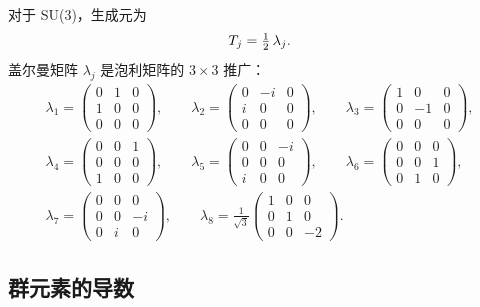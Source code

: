 对于 SU(3)，生成元为
\begin{equation}
  T_j = \tfrac{1}{2}\,\lambda_j .
\end{equation}
盖尔曼矩阵 $\lambda_j$ 是泡利矩阵的 $3\times 3$ 推广：
\begin{equation}
  \begin{gathered}
    \lambda_1 = \begin{pmatrix} 0 & 1 & 0 \\ 1 & 0 & 0 \\ 0 & 0 & 0 \end{pmatrix},\qquad
    \lambda_2 = \begin{pmatrix} 0 & -i & 0 \\ i & 0 & 0 \\ 0 & 0 & 0 \end{pmatrix},\qquad
    \lambda_3 = \begin{pmatrix} 1 & 0 & 0 \\ 0 & -1 & 0 \\ 0 & 0 & 0 \end{pmatrix},\\[4pt]
    \lambda_4 = \begin{pmatrix} 0 & 0 & 1 \\ 0 & 0 & 0 \\ 1 & 0 & 0 \end{pmatrix},\qquad
    \lambda_5 = \begin{pmatrix} 0 & 0 & -i \\ 0 & 0 & 0 \\ i & 0 & 0 \end{pmatrix},\qquad
    \lambda_6 = \begin{pmatrix} 0 & 0 & 0 \\ 0 & 0 & 1 \\ 0 & 1 & 0 \end{pmatrix},\\[4pt]
    \lambda_7 = \begin{pmatrix} 0 & 0 & 0 \\ 0 & 0 & -i \\ 0 & i & 0 \end{pmatrix},\qquad
    \lambda_8 = \frac{1}{\sqrt{3}}
    \begin{pmatrix} 1 & 0 & 0 \\ 0 & 1 & 0 \\ 0 & 0 & -2 \end{pmatrix}.
  \end{gathered}
\end{equation}

\subsection{群元素的导数}

